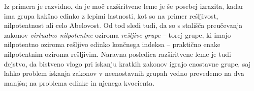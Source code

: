 Iz primera je razvidno, da je moč razširitvene leme je še posebej izrazita, kadar ima grupa kakšno edinko z lepimi lastnosti, kot so na primer rešljivost, nilpotentnost ali celo Abelovost. Od tod sledi tudi, da so s stališča preučevanja zakonov \emph{virtualno nilpotentne} oziroma \emph{rešljive grupe} -- torej grupe, ki imajo nilpotentno oziroma rešljivo edinko končnega indeksa --
praktično enake nilpotentnim oziroma rešljivim. Naravna posledica razširitvene leme je tudi dejstvo, da bistveno vlogo pri iskanju kratkih zakonov igrajo enostavne grupe, saj lahko problem iskanja zakonov v neenostavnih grupah vedno prevedemo na dva manjša; na problema edinke in njenega kvocienta.  
